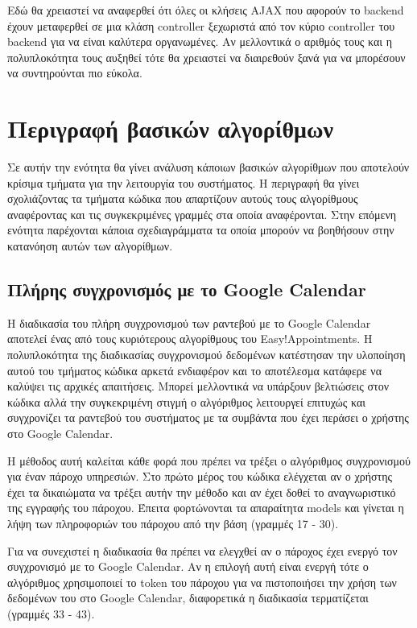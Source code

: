 Εδώ θα χρειαστεί να αναφερθεί ότι όλες οι κλήσεις AJAX που αφορούν το backend έχουν μεταφερθεί σε μια κλάση controller ξεχωριστά από τον κύριο controller του backend για να είναι καλύτερα οργανωμένες. Αν μελλοντικά ο αριθμός τους και η πολυπλοκότητα τους αυξηθεί τότε θα χρειαστεί να διαιρεθούν ξανά για να μπορέσουν να συντηρούνται πιο εύκολα.

\section{Περιγραφή βασικών αλγορίθμων}
Σε αυτήν την ενότητα θα γίνει ανάλυση κάποιων βασικών αλγορίθμων που αποτελούν κρίσιμα τμήματα για την λειτουργία του συστήματος. Η περιγραφή θα γίνει σχολιάζοντας τα τμήματα κώδικα που απαρτίζουν αυτούς τους αλγορίθμους αναφέροντας και τις συγκεκριμένες γραμμές στα οποία αναφέρονται. Στην επόμενη ενότητα παρέχονται κάποια σχεδιαγράμματα τα οποία μπορούν να βοηθήσουν στην κατανόηση αυτών των αλγορίθμων.

\subsection{Πλήρης συγχρονισμός με το Google Calendar}
Η διαδικασία του πλήρη συγχρονισμού των ραντεβού με το Google Calendar αποτελεί ένας από τους κυριότερους αλγορίθμους του Easy!Appointments. Η πολυπλοκότητα της διαδικασίας συγχρονισμού δεδομένων κατέστησαν την υλοποίηση αυτού του τμήματος κώδικα αρκετά ενδιαφέρον και το αποτέλεσμα κατάφερε να καλύψει τις αρχικές απαιτήσεις. Μπορεί μελλοντικά να υπάρξουν βελτιώσεις στον κώδικα αλλά την συγκεκριμένη στιγμή ο αλγόριθμος λειτουργεί επιτυχώς και συγχρονίζει τα ραντεβού του συστήματος με τα συμβάντα που έχει περάσει ο χρήστης στο Google Calendar.



Η μέθοδος αυτή καλείται κάθε φορά που πρέπει να τρέξει ο αλγόριθμος συγχρονισμού για έναν πάροχο υπηρεσιών. Στο πρώτο μέρος του κώδικα ελέγχεται αν ο χρήστης έχει τα δικαιώματα να τρέξει αυτήν την μέθοδο και αν έχει δοθεί το αναγνωριστικό της εγγραφής του πάροχου. Έπειτα φορτώνονται τα απαραίτητα models και γίνεται η λήψη των πληροφοριών του πάροχου από την βάση (γραμμές 17 - 30). 

Για να συνεχιστεί η διαδικασία θα πρέπει να ελεγχθεί αν ο πάροχος έχει ενεργό τον συγχρονισμό με το Google Calendar. Αν η επιλογή αυτή είναι ενεργή τότε ο αλγόριθμος χρησιμοποιεί το token του πάροχου για να πιστοποιήσει την χρήση των δεδομένων του στο Google Calendar, διαφορετικά η διαδικασία τερματίζεται (γραμμές 33 - 43). 

